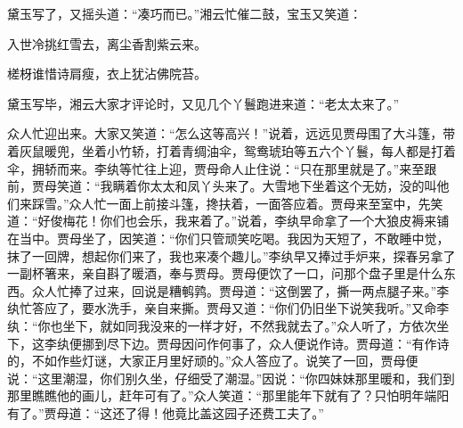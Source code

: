 黛玉写了，又摇头道：“凑巧而已。”湘云忙催二鼓，宝玉又笑道：

入世冷挑红雪去，离尘香割紫云来。

槎枒谁惜诗肩瘦，衣上犹沾佛院苔。

黛玉写毕，湘云大家才评论时，又见几个丫鬟跑进来道：“老太太来了。”

众人忙迎出来。大家又笑道：“怎么这等高兴！”说着，远远见贾母围了大斗篷，带着灰鼠暖兜，坐着小竹轿，打着青绸油伞，鸳鸯琥珀等五六个丫鬟，每人都是打着伞，拥轿而来。李纨等忙往上迎，贾母命人止住说：“只在那里就是了。”来至跟前，贾母笑道：“我瞒着你太太和凤丫头来了。大雪地下坐着这个无妨，没的叫他们来踩雪。”众人忙一面上前接斗篷，搀扶着，一面答应着。贾母来至室中，先笑道：“好俊梅花！你们也会乐，我来着了。”说着，李纨早命拿了一个大狼皮褥来铺在当中。贾母坐了，因笑道：“你们只管顽笑吃喝。我因为天短了，不敢睡中觉，抹了一回牌，想起你们来了，我也来凑个趣儿。”李纨早又捧过手炉来，探春另拿了一副杯箸来，亲自斟了暖酒，奉与贾母。贾母便饮了一口，问那个盘子里是什么东西。众人忙捧了过来，回说是糟鹌鹑。贾母道：“这倒罢了，撕一两点腿子来。”李纨忙答应了，要水洗手，亲自来撕。贾母又道：“你们仍旧坐下说笑我听。”又命李纨：“你也坐下，就如同我没来的一样才好，不然我就去了。”众人听了，方依次坐下，这李纨便挪到尽下边。贾母因问作何事了，众人便说作诗。贾母道：“有作诗的，不如作些灯谜，大家正月里好顽的。”众人答应了。说笑了一回，贾母便说：“这里潮湿，你们别久坐，仔细受了潮湿。”因说：“你四妹妹那里暖和，我们到那里瞧瞧他的画儿，赶年可有了。”众人笑道：“那里能年下就有了？只怕明年端阳有了。”贾母道：“这还了得！他竟比盖这园子还费工夫了。”

